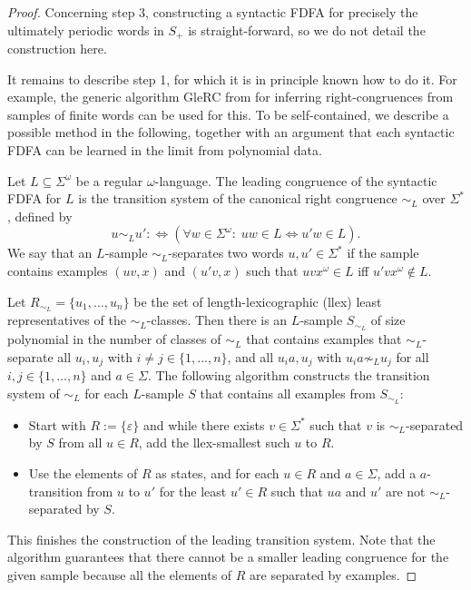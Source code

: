 \documentclass[a4paper,USenglish,cleveref,autoref,thm-restate]{lipics-v2021}
\begin{document}
{\begin{proof}
  Concerning step 3, constructing a syntactic FDFA for precisely the ultimately periodic words in $S_+$ is straight-forward, so we do not detail the construction here.

  It remains to describe step 1, for which it is in principle known how to do it. For example, the generic algorithm GleRC from \cite{BohnL24} for inferring right-congruences from samples of finite words can be used for this. To be self-contained, we describe a possible method in the following, together with an argument that each syntactic FDFA can be learned in the limit from polynomial data.
  
  Let $L \subseteq \Sigma^\omega$ be a regular $\omega$-language. The leading congruence of the syntactic FDFA for $L$ is the transition system of the canonical right congruence $\sim_L$ over $\Sigma^*$, defined by\[
  u \sim_L u' :\Leftrightarrow (\forall w \in \Sigma^\omega:\; uw \in L \Leftrightarrow u'w \in L).
  \]
We say that an $L$-sample $\sim_L$-separates two words $u,u' \in \Sigma^*$ if the sample contains examples $(uv,x)$ and $(u'v,x)$ such that $uvx^\omega \in L$ iff $u'vx^\omega \notin L$. 
  
Let $R_{\sim_L} = \{u_1, \ldots, u_n\}$ be the set of length-lexicographic (llex) least representatives of the $\sim_L$-classes. Then there is an $L$-sample $S_{\sim_L}$ of size polynomial in the number of classes of $\sim_L$ that contains examples that $\sim_L$-separate all $u_i,u_j$ with $i \not=j \in \{1, \ldots, n\}$, and all $u_ia,u_j$ with $u_ia \not\sim_L u_j$ for all $i,j \in \{1, \ldots, n\}$ and $a \in \Sigma$. The following algorithm constructs the transition system of $\sim_L$ for each $L$-sample $S$ that contains all examples from $S_{\sim_L}$:
\begin{itemize}
\item Start with $R := \{\varepsilon\}$ and while there exists $v \in \Sigma^*$ such that $v$ is $\sim_L$-separated by $S$ from all $u \in R$, add the llex-smallest such $u$ to $R$.
\item Use the elements of $R$ as states, and for each $u \in R$ and $a \in \Sigma$, add a $a$-transition from $u$ to $u'$ for the least $u' \in R$ such that $ua$ and $u'$ are not $\sim_L$-separated by $S$.
\end{itemize}
This finishes the construction of the leading transition system. Note that the algorithm guarantees that there cannot be a smaller leading congruence for the given sample because all the elements of $R$ are separated by examples.


\end{proof}}
\end{document}
